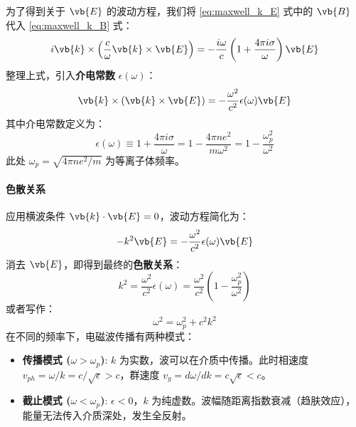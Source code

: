 为了得到关于 $\vb{E}$ 的波动方程，我们将 \eqref{eq:maxwell_k_E} 式中的 $\vb{B}$ 代入 \eqref{eq:maxwell_k_B} 式：
\begin{equation}
    i\vb{k} \times \left( \frac{c}{\omega} \vb{k} \times \vb{E} \right) = - \frac{i\omega}{c} \left( 1 + \frac{4\pi i \sigma}{\omega} \right) \vb{E}
\end{equation}
整理上式，引入\textbf{介电常数} $\epsilon(\omega)$：
\begin{equation}
    \vb{k} \times (\vb{k} \times \vb{E}) = - \frac{\omega^2}{c^2} \epsilon(\omega) \vb{E}
\end{equation}
其中介电常数定义为：
\begin{equation}
    \epsilon(\omega) \equiv 1 + \frac{4\pi i \sigma}{\omega} = 1 - \frac{4\pi n e^2}{m \omega^2} = 1 - \frac{\omega_p^2}{\omega^2}
\end{equation}
此处 $\omega_p = \sqrt{4\pi n e^2 / m}$ 为等离子体频率。
\paragraph{色散关系}
应用横波条件 $\vb{k} \cdot \vb{E} = 0$，波动方程简化为：
\begin{equation}
    -k^2 \vb{E} = - \frac{\omega^2}{c^2} \epsilon(\omega) \vb{E}
\end{equation}
消去 $\vb{E}$，即得到最终的\textbf{色散关系}：
\begin{equation}
    k^2 = \frac{\omega^2}{c^2} \epsilon(\omega) = \frac{\omega^2}{c^2} \left( 1 - \frac{\omega_p^2}{\omega^2} \right)
\end{equation}
或者写作：
\begin{equation}
    \omega^2 = \omega_p^2 + c^2 k^2
\end{equation}
在不同的频率下，电磁波传播有两种模式：
    \begin{itemize}
        \item \textbf{传播模式 ($\omega > \omega_p$)}: $k$ 为实数，波可以在介质中传播。此时相速度 $v_{ph} = \omega/k = c/\sqrt{\epsilon} > c$，群速度 $v_g = d\omega/dk = c\sqrt{\epsilon} < c$。
        \item \textbf{截止模式 ($\omega < \omega_p$)}: $\epsilon < 0$，$k$ 为纯虚数。波幅随距离指数衰减（趋肤效应），能量无法传入介质深处，发生全反射。
    \end{itemize}

